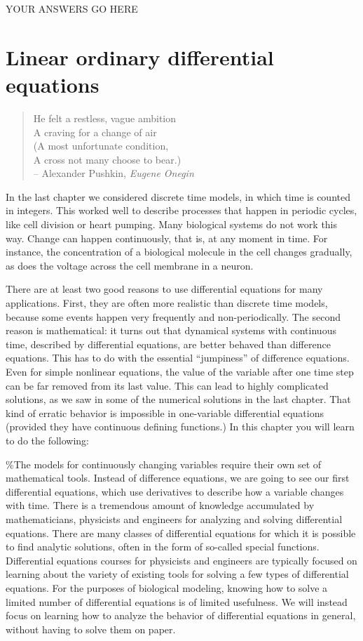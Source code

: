 \documentclass[
]{book}
\theoremstyle{definition}
\theoremstyle{definition}
\theoremstyle{definition}
\theoremstyle{remark}
\begin{document}
YOUR ANSWERS GO HERE

\hypertarget{linear-ordinary-differential-equations}{%
\chapter{Linear ordinary differential equations}\label{linear-ordinary-differential-equations}}

\begin{quote}
He felt a restless, vague ambition\\
A craving for a change of air\\
(A most unfortunate condition,\\
A cross not many choose to bear.)\\
-- Alexander Pushkin, \emph{Eugene Onegin}
\end{quote}

In the last chapter we considered discrete time models, in which time is counted in integers. This worked well to describe processes that happen in periodic cycles, like cell division or heart pumping. Many biological systems do not work this way. Change can happen continuously, that is, at any moment in time. For instance, the concentration of a biological molecule in the cell changes gradually, as does the voltage across the cell membrane in a neuron.

There are at least two good reasons to use differential equations for many applications. First, they are often more realistic than discrete time models, because some events happen very frequently and non-periodically. The second reason is mathematical: it turns out that dynamical systems with continuous time, described by differential equations, are better behaved than difference equations. This has to do with the essential ``jumpiness'' of difference equations. Even for simple nonlinear equations, the value of the variable after one time step can be far removed from its last value. This can lead to highly complicated solutions, as we saw in some of the numerical solutions in the last chapter. That kind of erratic behavior is impossible in one-variable differential equations (provided they have continuous defining functions.) In this chapter you will learn to do the following:

\%The models for continuously changing variables require their own set of mathematical tools. Instead of difference equations, we are going to see our first differential equations, which use derivatives to describe how a variable changes with time. There is a tremendous amount of knowledge accumulated by mathematicians, physicists and engineers for analyzing and solving differential equations. There are many classes of differential equations for which it is possible to find analytic solutions, often in the form of so-called special functions. Differential equations courses for physicists and engineers are typically focused on learning about the variety of existing tools for solving a few types of differential equations. For the purposes of biological modeling, knowing how to solve a limited number of differential equations is of limited usefulness. We will instead focus on learning how to analyze the behavior of differential equations in general, without having to solve them on paper.
\end{document}
